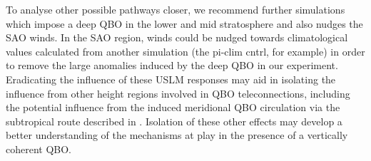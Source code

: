To analyse other possible pathways closer, we recommend further simulations which impose a deep QBO in the lower and mid stratosphere and also nudges the SAO winds. In the SAO region, winds could be nudged towards climatological values calculated from another simulation (the pi-clim cntrl, for example) in order to remove the large anomalies induced by the deep QBO in our experiment. Eradicating the influence of these USLM responses may aid in isolating the influence from other height regions involved in QBO teleconnections, including the potential influence from the induced meridional QBO circulation via the subtropical route described in \cite{graySurface2018b}. Isolation of these other effects may develop a better understanding of the mechanisms at play in the presence of a vertically coherent QBO.  
















